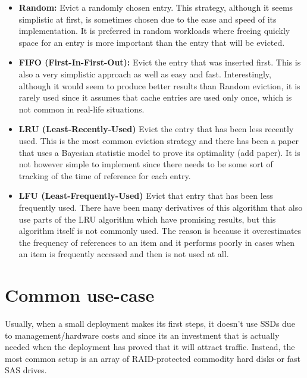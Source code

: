 %
\begin{itemize}
	\item \textbf{Random:} Evict a randomly chosen entry. This strategy, 
		although it seems simplistic at first, is sometimes chosen due to the 
		ease and speed of its implementation. It is preferred in random 
		workloads where freeing quickly space for an entry is more important 
		than the entry that will be evicted.
	\item \textbf{FIFO (First-In-First-Out):} Evict the entry that was inserted 
		first. This is also a very simplistic approach as well as easy and 
		fast.  Interestingly, although it would seem to produce better results 
		than Random eviction, it is rarely used since it assumes that cache 
		entries are used only once, which is not common in real-life 
		situations.
	\item \textbf{LRU (Least-Recently-Used)}
		Evict the entry that has been less recently used. This is the most 
		common eviction strategy and there has been a paper that uses a 
		Bayesian statistic model to prove its optimality (\fixme add paper). It 
		is not however simple to implement since there needs to be some sort of 
		tracking of the time of reference for each entry.
	\item \textbf{LFU (Least-Frequently-Used)}
		Evict that entry that has been less frequently used. There have been 
		many derivatives of this algorithm that also use parts of the LRU 
		algorithm which have promising results, but this algorithm itself is
		not commonly used. The reason is because it overestimates the frequency 
		of references to an item and it performs poorly in cases when an item 
		is frequently accessed and then is not used at all.
\end{itemize}


\section{Common use-case}

Usually, when a small deployment makes its first steps, it doesn't use SSDs due 
to management/hardware costs and since its an investment that is actually 
needed when the deployment has proved that it will attract traffic. Instead, 
the most common setup is an array of RAID-protected commodity hard disks or 
fast SAS drives.

